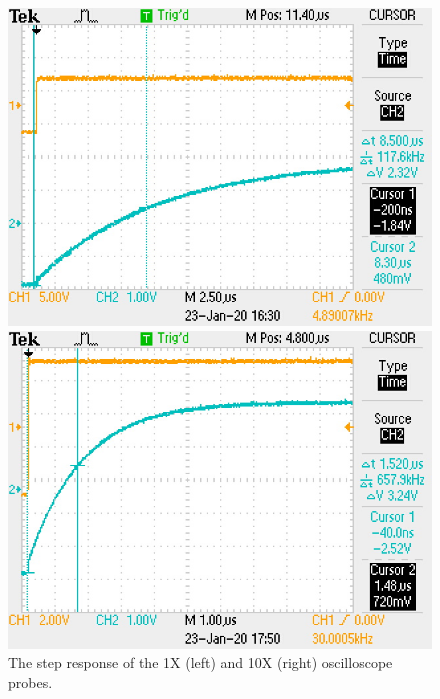 \documentclass{report}
\begin{document}
\begin{figure}[H]
	\begin{minipage}{0.5\linewidth}
		\includegraphics[width=1.0\linewidth]{ALL0012/F0012TEK}
	\end{minipage}
	\begin{minipage}{0.5\linewidth}
		\includegraphics[width=1.0\linewidth]{ALL0014/F0014TEK}
	\end{minipage}
	\caption{The step response of the 1X (left) and 10X (right) oscilloscope probes.}
	\label{fig:1d}
\end{figure}

\vfill
\hspace{0pt}
\pagebreak
\end{document}
